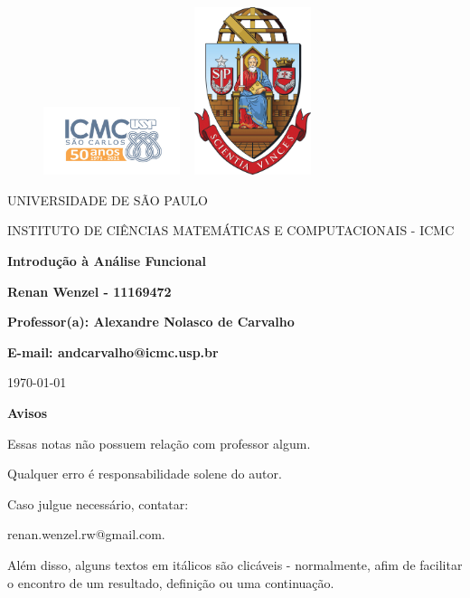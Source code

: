 \documentclass[12pt]{article}
\theoremstyle{definition}
\begin{document}
\begin{figure}[ht]
	\includegraphics[width=4cm]{../icmc.png}
	\hspace{7cm}
	\includegraphics[height=4.9cm,width=4cm]{../brasao_usp_cor.jpg}
	\endminipage
\end{figure}

\begin{center}
	\vspace{1cm}
	\LARGE
	UNIVERSIDADE DE SÃO PAULO

	\vspace{1.3cm}
	\LARGE
	INSTITUTO DE CIÊNCIAS MATEMÁTICAS E COMPUTACIONAIS - ICMC

	\vspace{1.7cm}
	\Large
	\textbf{Introdução à Análise Funcional}

	\vspace{1.3cm}
	\large
	\textbf{Renan Wenzel - 11169472}

	\vspace{1.3cm}
	\large
	\textbf{Professor(a): Alexandre Nolasco de Carvalho}

	\textbf{E-mail: andcarvalho@icmc.usp.br}

	\vspace{1.3cm}
	\today
\end{center}

\newpage
\textbf{{\Huge Avisos}}

{\huge Essas notas não possuem relação com professor algum.

	Qualquer erro é responsabilidade solene do autor.

	Caso julgue necessário, contatar:

	renan.wenzel.rw@gmail.com.

	Além disso, alguns textos em itálicos são clicáveis - normalmente, afim de facilitar o encontro de um resultado, definição ou uma continuação.
}
\end{document}
